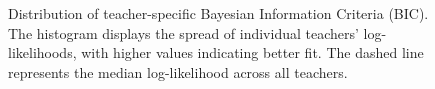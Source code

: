 \documentclass[
  number,
  preprint,
  3p,
  onecolumn]{elsarticle}
\begin{document}
\begin{figure}


\caption{\label{fig-loglik-histogram}Distribution of teacher-specific
Bayesian Information Criteria (BIC). The histogram displays the spread
of individual teachers' log-likelihoods, with higher values indicating
better fit. The dashed line represents the median log-likelihood across
all teachers.}

\end{figure}%
\end{document}
